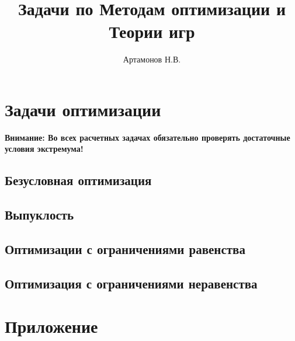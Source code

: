 \documentclass[12pt]{article}
\title{Задачи по Методам оптимизации и Теории игр}
\author{Артамонов Н.В.}
\theoremstyle{remark}
\begin{document}
\maketitle

\tableofcontents

\section{Задачи оптимизации}

\textbf{Внимание: Во всех расчетных задачах обязательно проверять достаточные условия экстремума!}

\subsection{Безусловная оптимизация}



\subsection{Выпуклость}



\subsection{Оптимизации с ограничениями  равенства}



\subsection{Оптимизация с ограничениями неравенства}



\appendix

\section{Приложение}


\end{document}
